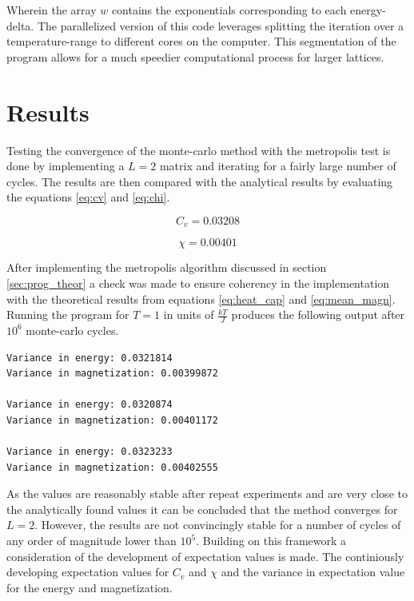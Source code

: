 \documentclass[12pt]{article}
\begin{document}
Wherein the array $w$ contains the exponentials corresponding to each energy-delta. The parallelized version of this code leverages splitting the iteration over a temperature-range to different cores on the computer. This segmentation of the program allows for a much speedier computational process for larger lattices.
\section*{Results}

Testing the convergence of the monte-carlo method with the metropolis test is done by implementing a $L = 2$ matrix and iterating for a fairly large number of cycles. The results are then compared with the analytical results by evaluating the equations \ref{eq:cv} and \ref{eq:chi}.

\begin{equation}\label{eq:heat_cap}
C_v = 0.03208
\end{equation}

\begin{equation}\label{eq:mean_magn}
\chi = 0.00401
\end{equation}

After implementing the metropolis algorithm discussed in section \ref{sec:prog_theor} a check was made to ensure coherency in the implementation with the theoretical results from equations \ref{eq:heat_cap} and \ref{eq:mean_magn}. Running the program for $T = 1$ in units of $\frac{kT}{J}$ produces the following output after $10^6$ monte-carlo cycles.

\begin{lstlisting}
Variance in energy: 0.0321814
Variance in magnetization: 0.00399872

Variance in energy: 0.0320874
Variance in magnetization: 0.00401172

Variance in energy: 0.0323233
Variance in magnetization: 0.00402555
\end{lstlisting} 

\noindent As the values are reasonably stable after repeat experiments and are very close to the analytically found values it can be concluded that the method converges for $L = 2$. However, the results are not convincingly stable for a number of cycles of any order of magnitude lower than $10^5$. Building on this framework a consideration of the development of expectation values is made. The continiously developing expectation values for  $C_v$ and $\chi$  and the variance in expectation value for the energy and magnetization.
\end{document}
